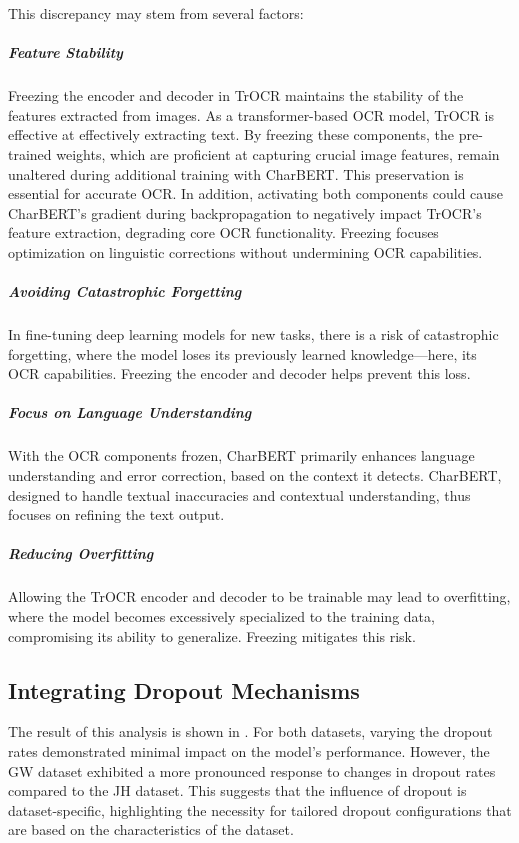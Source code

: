 This discrepancy may stem from several factors:

\subparagraph*{Feature Stability}
Freezing the encoder and decoder in TrOCR maintains the stability of the features extracted from images. As a transformer-based OCR model, TrOCR is effective at effectively extracting text. By freezing these components, the pre-trained weights, which are proficient at capturing crucial image features, remain unaltered during additional training with CharBERT. This preservation is essential for accurate OCR. In addition, activating both components could cause CharBERT's gradient during backpropagation to negatively impact TrOCR's feature extraction, degrading core OCR functionality. Freezing focuses optimization on linguistic corrections without undermining OCR capabilities.

\subparagraph*{Avoiding Catastrophic Forgetting}
In fine-tuning deep learning models for new tasks, there is a risk of catastrophic forgetting, where the model loses its previously learned knowledge—here, its OCR capabilities. Freezing the encoder and decoder helps prevent this loss.

\subparagraph*{Focus on Language Understanding}
With the OCR components frozen, CharBERT primarily enhances language understanding and error correction, based on the context it detects. CharBERT, designed to handle textual inaccuracies and contextual understanding, thus focuses on refining the text output.

\subparagraph*{Reducing Overfitting}
Allowing the TrOCR encoder and decoder to be trainable may lead to overfitting, where the model becomes excessively specialized to the training data, compromising its ability to generalize. Freezing mitigates this risk.

\subsection{Integrating Dropout Mechanisms}
\label{subsec:5_integrating_dropout_mechanisms}
The result of this analysis is shown in . For both datasets, varying the dropout rates demonstrated minimal impact on the model's performance. However, the GW dataset exhibited a more pronounced response to changes in dropout rates compared to the JH dataset. This suggests that the influence of dropout is dataset-specific, highlighting the necessity for tailored dropout configurations that are based on the characteristics of the dataset.

